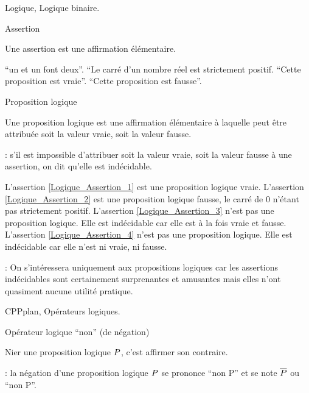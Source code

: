 
\fi

%

\Chapter Logique, Logique binaire. 

\Concept Assertion


\Definition 
Une assertion est une affirmation élémentaire. 

\Exemple
{}\qquad{} ``un et un font deux''.
\qquad{} ``Le carré d'un nombre réel est strictement positif.
\qquad{} ``Cette proposition est vraie''. 
\qquad{} ``Cette proposition est fausse''. 

\Concept Proposition logique

\Definition
Une proposition logique est une affirmation élémentaire à laquelle peut être attribuée soit la valeur vraie, soit la valeur fausse. 

\Remarque : s'il est impossible d'attribuer soit la valeur vraie, soit la valeur fausse à une assertion, on dit qu'elle est indécidable. 
\bigskip

\Exemple
{} L'assertion \eqref{Logique_Assertion_1} est une proposition logique vraie. 
 L'assertion \eqref{Logique_Assertion_2} est une proposition logique fausse, le carré de $0$ n'étant pas strictement positif.
 L'assertion \eqref{Logique_Assertion_3} n'est pas une proposition logique. Elle est indécidable car  elle  est à la fois vraie et fausse. 
 L'assertion \eqref{Logique_Assertion_4} n'est pas une proposition logique. Elle est indécidable car  elle  n'est ni vraie, ni fausse. 

\Remarque : On s'intéressera uniquement aux propositions logiques car les assertions indécidables 
sont certainement surprenantes et amusantes mais elles n'ont quasiment aucune utilité pratique. 

\Section CPPplan, Opérateurs logiques. 

\Concept [Title=Opérateur logique ``non''] Opérateur logique ``non'' (de négation)

\Definition
Nier une proposition logique $\sc P$, c'est affirmer son contraire. 

\Remarque : la négation d'une proposition logique $\sc P$ se prononce ``non \sc P'' et se note $\overline{\sc P}$ ou ``non \sc P''. 
\bigskip

